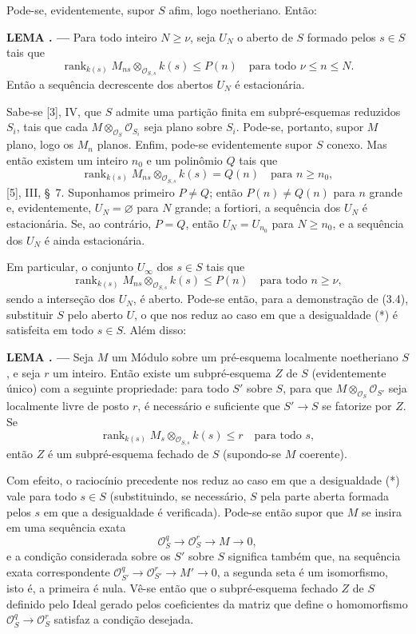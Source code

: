 \documentclass[11pt,twoside,openany]{book}
\numberwithin{equation}{section}
\newcommand{\src}[1]{%
  \phantomsection\hypertarget{src:#1}{}%
  \marginpar{\raggedleft\footnotesize\sffamily #1}%
}
\theoremstyle{plain}
\theoremstyle{definition}
\theoremstyle{remark}
\newcommand{\result}[2]{%
  \par\medskip\noindent\textbf{#1%
  \if\relax\detokenize{#2}\relax\else\space#2\fi. ---}\enspace
}
\newcommand{\FgaUnitKey}{frontmatter}
\renewcommand{\src}[1]{%
  \phantomsection\hypertarget{src:\FgaUnitKey:#1}{}%
  \marginpar{\raggedleft\footnotesize\sffamily #1}%
}
\begin{document}
Pode-se, evidentemente, supor $S$ afim, logo noetheriano. Então:

\result{LEMA}{3.5} Para todo inteiro $N\geq\nu$, seja $U_N$ o aberto de $S$
formado pelos $s\in S$ tais que
\[
\operatorname{rank}_{k(s)}
M_{ns}\otimes_{\mathcal O_{S,s}}k(s)\leq P(n)
\quad\text{para todo $\nu\leq n\leq N$}.
\]
Então a sequência decrescente dos abertos $U_N$ é estacionária.

Sabe-se [3], IV, que $S$ admite uma partição finita em subpré-esquemas
reduzidos $S_i$, tais que cada
$M\otimes_{\mathcal O_S}\mathcal O_{S_i}$ seja plano sobre $S_i$. Pode-se,
portanto, supor $M$ plano, logo os $M_n$ planos. Enfim, pode-se evidentemente
supor $S$ conexo. Mas então existem um inteiro $n_0$ e um polinômio $Q$ tais
que
\[
\operatorname{rank}_{k(s)}
M_{ns}\otimes_{\mathcal O_{S,s}}k(s)=Q(n)
\quad\text{para $n\geq n_0$},
\]
[5], III, \S~7. Suponhamos primeiro $P\neq Q$; então $P(n)\neq Q(n)$ para $n$
grande e, evidentemente, $U_N=\varnothing$ para $N$ grande; a fortiori, a
sequência dos $U_N$ é estacionária. Se, ao contrário, $P=Q$, então $U_N=U_{n_0}$ para $N\geq n_0$, e
a sequência dos $U_N$ é ainda estacionária.

Em particular, o conjunto $U_\infty$ dos $s\in S$ tais que
\[
\tag{*}
\operatorname{rank}_{k(s)}
M_{ns}\otimes_{\mathcal O_{S,s}}k(s)\leq P(n)
\quad\text{para todo $n\geq\nu$},
\]
sendo a interseção dos $U_N$, é aberto. Pode-se então, para a demonstração de
(3.4), substituir $S$ pelo aberto $U$, o que nos reduz ao caso em que a
desigualdade (*) é satisfeita em todo $s\in S$. Além disso:

\result{LEMA}{3.6} Seja $M$ um Módulo sobre um pré-esquema localmente
noetheriano $S$, e seja $r$ um inteiro. Então existe um subpré-esquema $Z$ de
$S$ (evidentemente único) com a seguinte propriedade: para todo $S'$ sobre
$S$, para que $M\otimes_{\mathcal O_S}\mathcal O_{S'}$ seja localmente
livre de posto $r$, é necessário e suficiente que $S'\longrightarrow S$ se
fatorize por $Z$. Se
\[
\operatorname{rank}_{k(s)}
M_s\otimes_{\mathcal O_{S,s}}k(s)\leq r
\quad\text{para todo $s$},
\]
então $Z$ é um subpré-esquema fechado de $S$ (supondo-se $M$ coerente).
\src{264}
Com efeito, o raciocínio precedente nos reduz ao caso em que a desigualdade
(*) vale para todo $s\in S$ (substituindo, se necessário, $S$ pela parte
aberta formada pelos $s$ em que a desigualdade é verificada). Pode-se então
supor que $M$ se insira em uma sequência exata
\[
\mathcal O_S^q\longrightarrow\mathcal O_S^r\longrightarrow M\longrightarrow0,
\]
e a condição considerada sobre os $S'$ sobre $S$ significa também que, na
sequência exata correspondente
$\mathcal O_{S'}^q\longrightarrow\mathcal O_{S'}^r
\longrightarrow M'\longrightarrow0$, a segunda seta é um isomorfismo, isto
é, a primeira é nula. Vê-se então que o subpré-esquema fechado $Z$ de $S$
definido pelo Ideal gerado pelos coeficientes da matriz que define o
homomorfismo $\mathcal O_S^q\longrightarrow\mathcal O_S^r$ satisfaz a
condição desejada.
\end{document}
